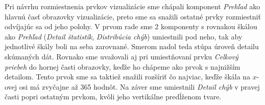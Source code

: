 Pri návrhu rozmiestnenia prvkov vizualizácie sme chápali komponent \textit{Prehľad} ako hlavnú časť obrazovky vizualizácie, preto sme sa snažili ostatné prvky rozmiestniť odvíjajúc sa od jeho polohy. V prvom rade sme 2 komponenty s rovnakou škálou ako \textit{Prehľad} (\textit{Detail štatistík}, \textit{Distribúcia chýb}) umiestnili pod neho, tak aby jednotlivé škály boli na seba zarovnané. Smerom nadol teda stúpa úroveň detailu skúmaných dát. Rovnako sme uvažovali aj pri umiestňovaní prvku \textit{Celkový priebeh} do hornej časti obrazovky, keďže ho chápeme ako prvok s najnižším detailom. Tento prvok sme sa taktiež snažili rozšíriť čo najviac, keďže škála na \mbox{$ x $-ovej} osi má zvyčajne až 365 hodnôt. Na záver sme umiestnili \textit{Detail chýb} v pravej časti popri ostatným prvkom, kvôli jeho vertikálne predĺženom tvare.
